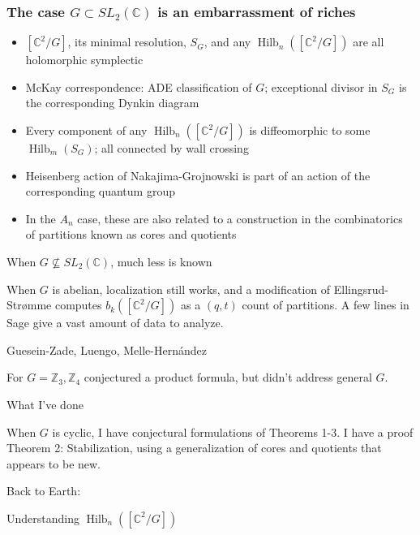 \documentclass{beamer}
\DeclareMathOperator{\Hilb}{Hilb}
\newcommand{\C}{\mathbb{C}}
\newcommand{\Z}{\mathbb{Z}}
\begin{document}
\begin{frame}
  \frametitle{The case  $G\subset SL_2(\C)$ is an embarrassment of riches}

\begin{itemize}
\item $[\C^2/G]$, its minimal resolution, $S_G$, and any
  $\Hilb_n([\C^2/G])$ are all holomorphic
symplectic
\item McKay correspondence: ADE classification of $G$; exceptional
  divisor in $S_G$ is the corresponding Dynkin diagram 
\item Every component of any $\Hilb_n([\C^2/G])$ is diffeomorphic to
  some $\Hilb_m(S_G)$; all connected by wall crossing
\item Heisenberg action of Nakajima-Grojnowski is part of an action of
  the corresponding quantum group   
\item  In the $A_n$ case, these are also related to a construction in the
combinatorics of partitions known as cores and quotients
\end{itemize}

\end{frame}

\begin{frame}{When $G\nsubseteq SL_2(\C)$, much less is known}


When $G$ is abelian, localization still works, and a modification of
Ellingsrud-Str\o mme computes $b_k([\C^2/G])$ as a $(q,t)$ count of partitions.  A few lines in Sage give a vast amount of data to analyze.


\begin{block}{Guesein-Zade, Luengo, Melle-Hern\'andez} 



For $G=\Z_3, \Z_4$ conjectured a product formula, but didn't address general $G$.
\end{block}
\begin{block}{What I've done} 


When $G$ is cyclic, I have conjectural formulations of Theorems 1-3.
I have a proof Theorem 2: Stabilization, using a generalization of cores
and quotients that appears to be new.
\end{block}

\end{frame}


\begin{frame}[plain,c]

\begin{center}

\Huge

Back to Earth:
 \end{center}

\begin{center}
\Huge
Understanding $\Hilb_n([\C^2/G])$
\end{center}

\end{frame}
\end{document}
